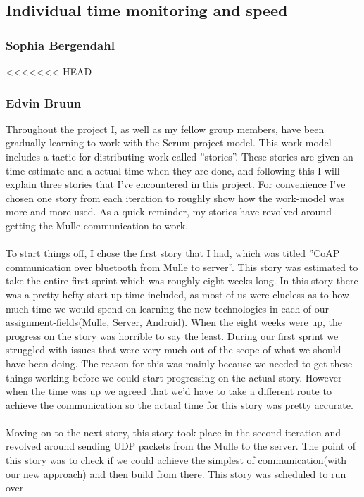 \subsection{Individual time monitoring and speed}
\subsubsection{Sophia Bergendahl}
<<<<<<< HEAD
\newpage
\subsubsection{Edvin Bruun}
Throughout the project I, as well as my fellow group members, have been gradually learning to work with the Scrum project-model.
This work-model includes a tactic for distributing work called ''stories''. These stories are given an time estimate and a actual time when they are done, 
and following this I will explain three stories that I've encountered in this project. 
For convenience I've chosen one story from each iteration to roughly show how the work-model was more and more used. As a quick reminder, my stories have revolved around getting the Mulle-communication to work.
\\\\
To start things off, I chose the first story that I had, which was titled ''CoAP communication over bluetooth from Mulle to server''.
This story was estimated to take the entire first sprint which was roughly eight weeks long. In this story there was a pretty hefty start-up time included, 
as most of us were clueless as to how much time we would spend on learning the new technologies in each of our assignment-fields(Mulle, Server, Android).
When the eight weeks were up, the progress on the story was horrible to say the least. During our first sprint we struggled with issues that were very much 
out of the scope of what we should have been doing. The reason for this was mainly because we needed to get these things working before we could start progressing on the actual story.
However when the time was up we agreed that we'd have to take a different route to achieve the communication so the actual time for this story was pretty accurate.
\\\\
Moving on to the next story, this story took place in the second iteration and revolved around sending UDP packets from the Mulle to the server.
The point of this story was to check if we could achieve the simplest of communication(with our new approach) and then build from there. This story was scheduled to run over 
